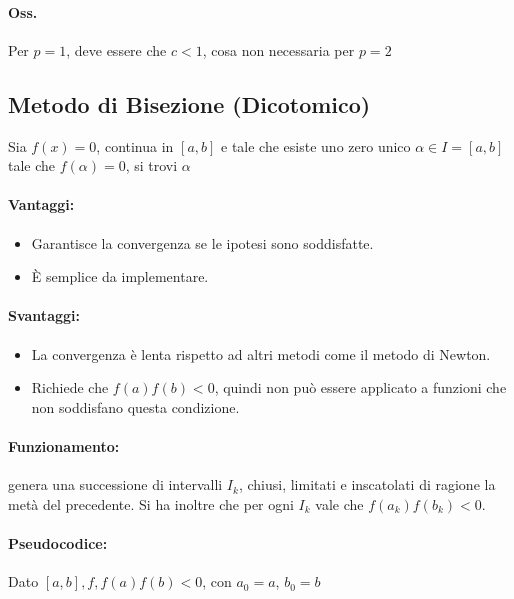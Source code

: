 \documentclass[a4paper, 11pt]{article}
\begin{document}
        
        \paragraph{Oss. } Per \( p = 1 \), deve essere che \( c < 1 \), cosa non necessaria per $p = 2$
        


        \subsection{Metodo di Bisezione (Dicotomico)}
        Sia $f(x) = 0$, continua in \([a, b]\) e tale che esiste uno zero unico \( \alpha \in I = [a, b] \) tale che \( f(\alpha) = 0 \), si trovi $\alpha$

        \paragraph{Vantaggi:}
        \begin{itemize}
            \item Garantisce la convergenza se le ipotesi sono soddisfatte.
            \item È semplice da implementare.
        \end{itemize}

        \paragraph{Svantaggi:}
        \begin{itemize}
            \item La convergenza è lenta rispetto ad altri metodi come il metodo di Newton.
            \item Richiede che \( f(a)f(b) < 0 \), quindi non può essere applicato a funzioni che non soddisfano questa condizione.
        \end{itemize}

        \paragraph{Funzionamento: } genera una successione di intervalli $I_k$, chiusi, limitati e inscatolati di ragione la metà del precedente. Si ha inoltre che per ogni $I_k$ vale che $f(a_k)f(b_k) < 0$.

        \paragraph{Pseudocodice:}
        Dato $[a,b], f, f(a)f(b) < 0$, con $a_0 = a$, $b_0 = b$
        
\end{document}
